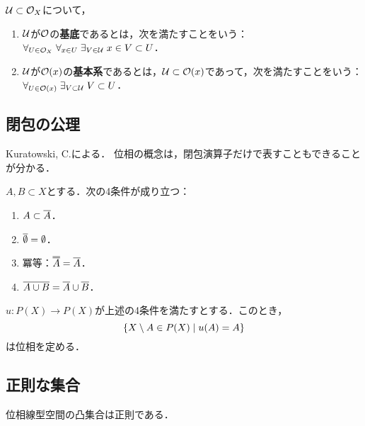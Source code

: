 \documentclass[uplatex,dvipdfmx]{jsreport}
\begin{document}
\begin{definition}
    $\mathcal{U}\subset\mathcal{O}_X$について，
    \begin{enumerate}
        \item $\mathcal{U}$が$\mathcal{O}$の\textbf{基底}であるとは，次を満たすことをいう：$\forall_{U\in\mathcal{O}_X}\;\forall_{x\in U}\;\exists_{V\in\mathcal{U}}\;x\in V\subset U$．
        \item $\mathcal{U}$が$\mathcal{O}(x)$の\textbf{基本系}であるとは，$\mathcal{U}\subset\mathcal{O}(x)$であって，次を満たすことをいう：$\forall_{U\in\mathcal{O}(x)}\;\exists_{V\subset\mathcal{U}}\;V\subset U$．
    \end{enumerate}
\end{definition}

\subsection{閉包の公理}

\begin{tcolorbox}[colframe=ForestGreen, colback=ForestGreen!10!white,breakable,colbacktitle=ForestGreen!40!white,coltitle=black,fonttitle=\bfseries\sffamily,
title=]
    Kuratowski, C.による．
    位相の概念は，閉包演算子だけで表すこともできることが分かる．
\end{tcolorbox}

\begin{proposition}
    $A,B\subset X$とする．次の4条件が成り立つ：
    \begin{enumerate}
        \item $A\subset\overline{A}$．
        \item $\overline{\emptyset}=\emptyset$．
        \item 冪等：$\oo{A}=\o{A}$．
        \item $\overline{A\cup B}=\overline{A}\cup\overline{B}$．
    \end{enumerate}
\end{proposition}

\begin{theorem}\label{thm-Kuratowski}
    $u:P(X)\to P(X)$が上述の4条件を満たすとする．このとき，
    \[\left\{X\setminus A\in P(X)\mid u(A)=A\right\}\]
    は位相を定める．
\end{theorem}

\subsection{正則な集合}

\begin{tcolorbox}[colframe=ForestGreen, colback=ForestGreen!10!white,breakable,colbacktitle=ForestGreen!40!white,coltitle=black,fonttitle=\bfseries\sffamily,
title=]
    位相線型空間の凸集合は正則である．
\end{tcolorbox}
\end{document}
